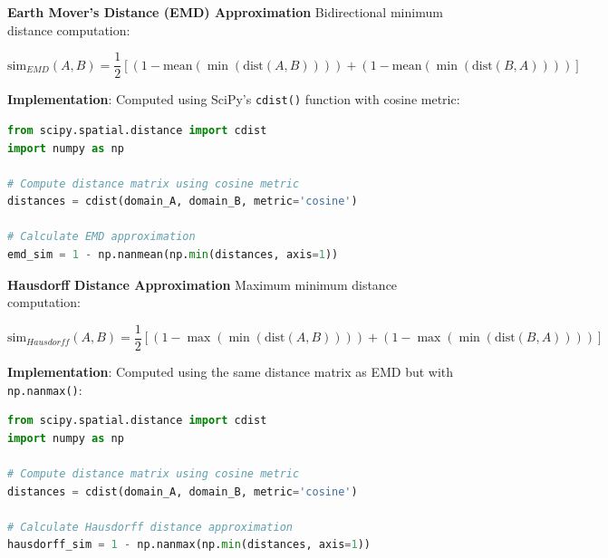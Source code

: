 \textbf{Earth Mover's Distance (EMD) Approximation}
Bidirectional minimum distance computation:

\begin{equation}
\text{sim}_{EMD}(A,B) = \frac{1}{2}\left[(1 - \text{mean}(\min(\text{dist}(A,B)))) + (1 - \text{mean}(\min(\text{dist}(B,A))))\right]
\end{equation}

\textbf{Implementation}: Computed using SciPy's \texttt{cdist()} function with cosine metric:

\begin{tcolorbox}[
    colback=gray!5!white,
    colframe=gray!60!black,
    title=\textbf{EMD Distance Computation},
    fonttitle=\bfseries,
    enhanced,
    arc=2mm,
    boxrule=0.5pt
]
\begin{lstlisting}[language=Python]
from scipy.spatial.distance import cdist
import numpy as np

# Compute distance matrix using cosine metric
distances = cdist(domain_A, domain_B, metric='cosine')

# Calculate EMD approximation
emd_sim = 1 - np.nanmean(np.min(distances, axis=1))
\end{lstlisting}
\end{tcolorbox}

\textbf{Hausdorff Distance Approximation}
Maximum minimum distance computation:

\begin{equation}
\text{sim}_{Hausdorff}(A,B) = \frac{1}{2}\left[(1 - \max(\min(\text{dist}(A,B)))) + (1 - \max(\min(\text{dist}(B,A))))\right]
\end{equation}

\textbf{Implementation}: Computed using the same distance matrix as EMD but with \texttt{np.nanmax()}:

\begin{tcolorbox}[
    colback=gray!5!white,
    colframe=gray!60!black,
    title=\textbf{Hausdorff Distance Computation},
    fonttitle=\bfseries,
    enhanced,
    arc=2mm,
    boxrule=0.5pt
]
\begin{lstlisting}[language=Python]
from scipy.spatial.distance import cdist
import numpy as np

# Compute distance matrix using cosine metric
distances = cdist(domain_A, domain_B, metric='cosine')

# Calculate Hausdorff distance approximation
hausdorff_sim = 1 - np.nanmax(np.min(distances, axis=1))
\end{lstlisting}
\end{tcolorbox}

